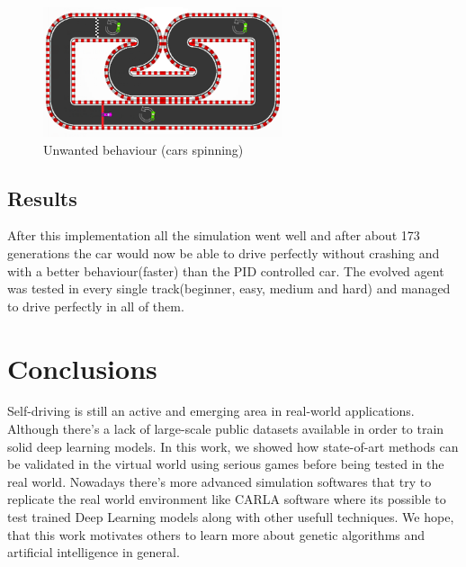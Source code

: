 \documentclass[conference]{IEEEtran}
\begin{document}
\begin{figure}[b]
    \centerline{\includegraphics[width=70mm,scale=4]{assets/bad-behaviour.png}}
    \caption{Unwanted behaviour (cars spinning)}
    \label{fig:bad-behavious}
\end{figure}

\subsection{Results}
After this implementation all the simulation went well and after about 173 generations the car would now be able to drive perfectly without crashing and with
a better behaviour(faster) than the PID controlled car. The evolved agent was tested in every single track(beginner, easy, medium and hard) and managed to drive
perfectly in all of them.

\section{Conclusions}
Self-driving is still an active and emerging area in real-world applications. Although there's a lack of large-scale
public datasets available in order to train solid deep learning models. In this work, we showed how state-of-art methods can be
validated in the virtual world using serious games before being tested in the real world. Nowadays there's more advanced simulation
softwares that try to replicate the real world environment like CARLA software where its possible to test trained Deep Learning models
along with other usefull techniques. We hope, that this work motivates others to learn more about genetic algorithms and artificial
intelligence \cite{AIMA} in general.




\vspace{12pt}
\end{document}
